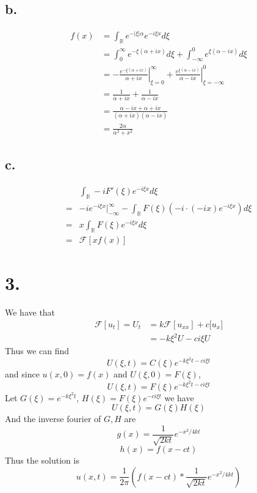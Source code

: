 \documentclass[11pt]{article}
\theoremstyle{mystyle}
\theoremstyle{definition}
\begin{document}
\subsection*{b.}
\begin{align*}
  f(x) &= \int_\mathbb{R} e^{-|\xi| \alpha} e^{-i\xi x} d\xi \\
  &= \int_0^\infty e^{-\xi(\alpha + ix)} d\xi + \int_{-\infty}^0 e^{\xi(\alpha - ix)} d\xi \\
  &= -\left.\displaystyle\frac{e^{-\xi(\alpha + ix)}}{\alpha + ix}\right|^\infty_{\xi = 0} + \left.\displaystyle\frac{e^{\xi(\alpha - ix)}}{\alpha - ix}\right|^0_{\xi = -\infty} \\
  &= \displaystyle\frac{1}{\alpha + ix} + \displaystyle\frac{1}{\alpha - ix}\\
  &= \displaystyle\frac{\alpha - ix + \alpha + ix}{(\alpha+ix)(\alpha -ix)} \\
  &= \displaystyle\frac{2\alpha}{\alpha^2 + x^2}
\end{align*}
\subsection*{c.}
\begin{align*}
  &\int_\mathbb{R} -iF'(\xi) e^{-i\xi x} d\xi \\
  =& -ie^{-i\xi x}|_{-\infty}^\infty - \int_\mathbb{R} F(\xi) (-i \cdot (-i x) e^{-i \xi x}) d\xi \\
  =& x\int_\mathbb{R} F(\xi)e^{-i\xi x} d\xi \\
  =& \mathcal F [x f(x)]
\end{align*}
\newpage
\section*{3.}
We have that 
\begin{align*}
  \mathcal F [u_t] = U_t &= k \mathcal F [u_{xx}] + c \mathcal[u_x] \\
  &= -k\xi^2 U - ci \xi U 
\end{align*}
Thus we can find 
\[
  U(\xi, t) = C(\xi) e^{-k \xi^2 t -ci\xi t}
\]
and since $u(x,0) = f(x)$ and $U(\xi,0) = F(\xi)$, 
\[
  U(\xi, t) = F(\xi) e^{-k \xi^2 t-ci \xi t }
\]
Let $G(\xi) = e^{-k\xi^2 t}$, $H(\xi) = F(\xi) e^{-ci \xi t}$ we have 
\[
  U(\xi, t) = G(\xi) H(\xi)
\]
And the inverse fourier of $G,H$ are 
\[
  g(x) = \displaystyle\frac{1}{\sqrt{2kt}} e^{-x^2/4kt}
\]
\[
  h(x) = f(x-ct)
\]
Thus the solution is 
\[
  u(x,t) = \displaystyle\frac{1}{2\pi} \left( f(x-ct) * \displaystyle\frac{1}{\sqrt{2kt}} e^{-x^2/4kt}\right)
\]
\newpage
\end{document}
